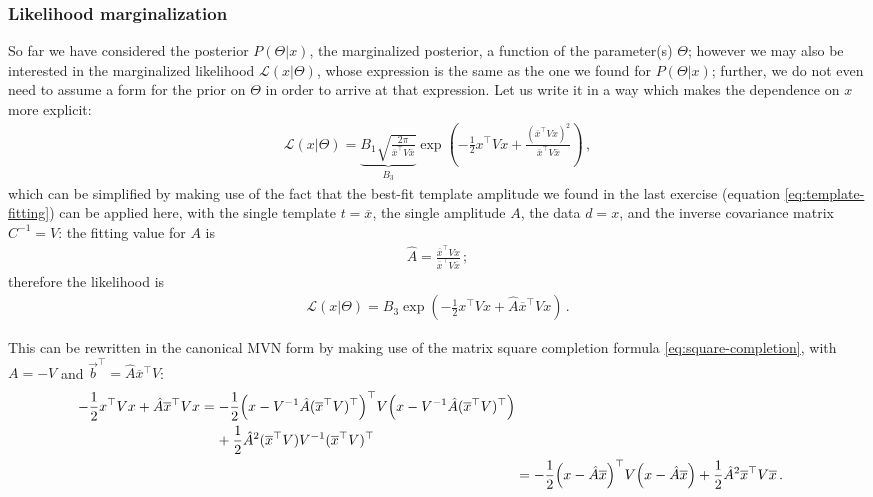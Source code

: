 \documentclass[main.tex]{subfiles}
\begin{document}
\subsubsection{Likelihood marginalization}

So far we have considered the posterior \(P(\Theta | x)\), the marginalized posterior, a function of the parameter(s) \(\Theta \); however we may also be interested in the marginalized likelihood \(\mathscr{L}(x | \Theta )\), whose expression is the same as the one we found for \(P(\Theta | x)\); further, we do not even need to assume a form for the prior on \(\Theta \) in order to arrive at that expression. Let us write it in a way which makes the dependence on \(x\) more explicit: 
%
\begin{align} \label{eq:marginalized-likelihood}
\mathscr{L}(x | \Theta ) = \underbrace{B_1 \sqrt{\frac{2 \pi }{\overline{x}^{\top} V \overline{x}}}}_{B_3 } \exp(- \frac{1}{2} x^{\top} V x + \frac{(\overline{x}^{\top} V x)^2}{\overline{x}^{\top} V \overline{x}})
\,,
\end{align}
%
which can be simplified by making use of the fact that the best-fit template amplitude we found in the last exercise (equation \eqref{eq:template-fitting}) can be applied here, with the single template \(t = \overline{x}\), the single amplitude \(A\), the data \(d = x\), and the inverse covariance matrix \(C^{-1}= V\): the fitting value for \(A \) is 
%
\begin{align}
\hat{A} = \frac{\overline{x}^{\top} V x}{\overline{x}^{\top} V \overline{x}}
\,;
\end{align}
%
therefore the likelihood is 
%
\begin{align}
\mathscr{L}(x | \Theta ) = B_3 \exp(- \frac{1}{2} x^{\top} V x + \hat{A} \overline{x}^{\top} V x)
\,.
\end{align}

This can be rewritten in the canonical MVN form by making use of the matrix square completion formula \eqref{eq:square-completion}, with \(A = -V\) and \(\vec{b}^{\top} = \hat{A} \overline{x}^{\top} V\): 
%
\begin{align}
\begin{split}
- \frac{1}{2} x^{\top} V x + \hat{A} \overline{x}^{\top} V x
&= - \frac{1}{2} 
\qty(x - V^{-1} \hat{A} (\overline{x}^{\top} V)^{\top})^{\top} V
\qty(x - V^{-1} \hat{A} (\overline{x}^{\top} V)^{\top}) \\
&\phantom{=}\ 
+ \frac{1}{2} \hat{A}^2 (\overline{x}^{\top} V) V^{-1} (\overline{x}^{\top} V)^{\top}  
\end{split}\\
&= - \frac{1}{2} 
\qty(x - \hat{A} \overline{x})^{\top}
V 
\qty(x - \hat{A} \overline{x})
+ 
\frac{1}{2} \hat{A}^2 \overline{x}^{\top} V \overline{x}
\,.
\end{align}
\end{document}

